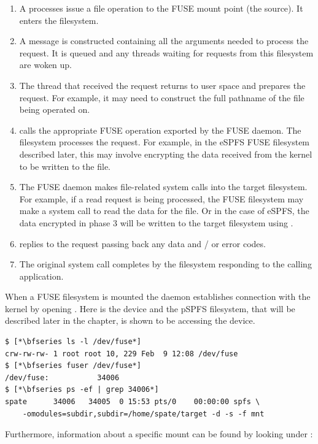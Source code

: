 \begin{enumerate}
	\item A processes issue a file operation to the FUSE mount point (the source). It enters the  filesystem. %
	\item A message is constructed containing all the arguments needed to process the request. It is queued
		and any threads waiting for requests from this filesystem are woken up.  %
	\item The thread that received the request returns to user space and prepares the request. For example, it
		may need to construct the full pathname of the file being operated on. %
	\item {} calls the appropriate FUSE operation exported by the FUSE daemon. The filesystem %
		processes the request. For example, in the eSPFS FUSE filesystem described later, this may involve
		encrypting the data received from the kernel to be written to the file.
	\item The FUSE daemon makes file-related system calls into the target filesystem. For example, if a read request is being %
		processed, the FUSE filesystem may make a  system call to read the data for the file. Or in the 
		case of eSPFS, the data encrypted in phase 3 will be written to the target filesystem using .
	\item {} replies to the request passing back any data and / or error codes. %
	\item The original system call completes by the  filesystem responding to the calling application. %
\end{enumerate}

\noindent 
When a FUSE filesystem is mounted the  daemon establishes connection with the kernel by opening . Here is  the device and the pSPFS filesystem, that will be described later in the chapter, is shown to be accessing the device.

\begin{lstlisting}
$ [*\bfseries ls -l /dev/fuse*]
crw-rw-rw- 1 root root 10, 229 Feb  9 12:08 /dev/fuse
$ [*\bfseries fuser /dev/fuse*]
/dev/fuse:           34006
$ [*\bfseries ps -ef | grep 34006*]
spate      34006   34005  0 15:53 pts/0    00:00:00 spfs \
    -omodules=subdir,subdir=/home/spate/target -d -s -f mnt
\end{lstlisting}

\noindent
Furthermore, information about a specific mount can be found by looking under :

